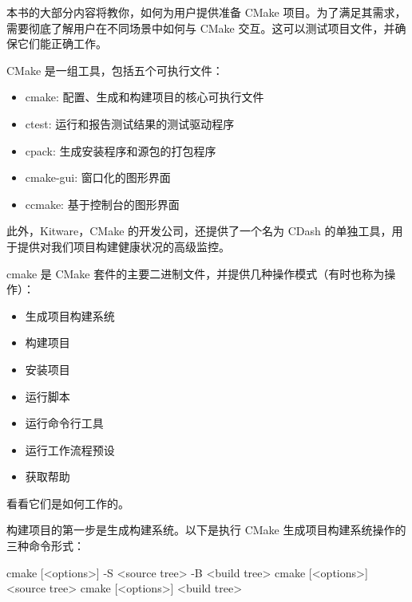 本书的大部分内容将教你，如何为用户提供准备 CMake 项目。为了满足其需求，需要彻底了解用户在不同场景中如何与 CMake 交互。这可以测试项目文件，并确保它们能正确工作。

CMake 是一组工具，包括五个可执行文件：

\begin{itemize}
\item
cmake: 配置、生成和构建项目的核心可执行文件

\item
ctest: 运行和报告测试结果的测试驱动程序

\item
cpack: 生成安装程序和源包的打包程序

\item
cmake-gui: 窗口化的图形界面

\item
ccmake: 基于控制台的图形界面
\end{itemize}

此外，Kitware，CMake 的开发公司，还提供了一个名为 CDash 的单独工具，用于提供对我们项目构建健康状况的高级监控。


cmake 是 CMake 套件的主要二进制文件，并提供几种操作模式（有时也称为操作）：

\begin{itemize}
\item
生成项目构建系统

\item
构建项目

\item
安装项目

\item
运行脚本

\item
运行命令行工具

\item
运行工作流程预设

\item
获取帮助
\end{itemize}

看看它们是如何工作的。


构建项目的第一步是生成构建系统。以下是执行 CMake 生成项目构建系统操作的三种命令形式：

\begin{shell}
cmake [<options>] -S <source tree> -B <build tree>
cmake [<options>] <source tree>
cmake [<options>] <build tree>
\end{shell}

